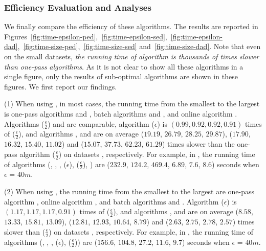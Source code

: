 \subsubsection{Efficiency Evaluation and Analyses}

We finally compare the efficiency of these algorithms.
The results are reported in Figures~\ref{fig:time-epsilon-ped},~\ref{fig:time-epsilon-sed},~\ref{fig:time-epsilon-dad},~\ref{fig:time-size-ped},~\ref{fig:time-size-sed} and~\ref{fig:time-size-dad}.
Note that even on the small datasets, \emph{the running time of algorithm \opt  is thousands of times slower than one-pass algorithms}. As it is not clear to show all these algorithms in a single figure, only the results of sub-optimal algorithms are shown in these figures.
We first report our findings.


\sstab (1) When using \ped, in most cases, the running time from the smallest to the largest is one-pass algorithms \siped and \operb, batch algorithms \tpa and \dpa, and online algorithm \bqsa.
Algorithms \siped($\frac{\epsilon}{2}$) and \operb are comparable, algorithm \siped(${\epsilon}$) is $(0.99, 0.92, 0.92, 0.91)$ times of \siped($\frac{\epsilon}{2}$), and algorithms \tpa, \dpa and \bqsa are on average
($19.19$, $26.79$, $28.25$, $29.87$), ($17.90$, $16.32$, $15.40$, $11.02$) and ($15.07$, $37.73$, $62.23$, $61.29$)
times slower than the one-pass algorithm \siped($\frac{\epsilon}{2}$) on datasets \dSets, respectively.
%
For example, in \mopsi, the running time of algorithms
(\tpa, \dpa, \bqsa, \siped(${\epsilon}$), \siped($\frac{\epsilon}{2}$), \operb ) are ($232.9$, $124.2$, $469.4$, $6.89$, $7.6$, $8.6$) seconds when $\epsilon$ = $40m$.

\sstab (2) When using \sed, the running time from the smallest to the largest are one-pass algorithm \cised, online algorithm \squishe, and batch algorithms \tpa and \dpa. Algorithm \cised(${\epsilon}$) is $(1.17, 1.17, 1.17, 0.91)$ times of \cised($\frac{\epsilon}{2}$), and algorithms \tpa, \dpa and \squishe are on average
($8.58$, $13.33$, $15.81$, $13.09$), ($12.81$, $12.93$, $10.64$, $8.79$) and
($2.63$, $2.75$, $2.78$, $2.57$) times slower than \cised($\frac{\epsilon}{2}$) on datasets \dSets, respectively.
%
For example, in \mopsi, the running time of algorithms
(\tpa, \dpa, \squishe, \cised($\epsilon$), \cised($\frac{\epsilon}{2}$)) are ($156.6$, $104.8$, $27.2$, $11.6$, $9.7$) seconds when $\epsilon$ = $40m$.

